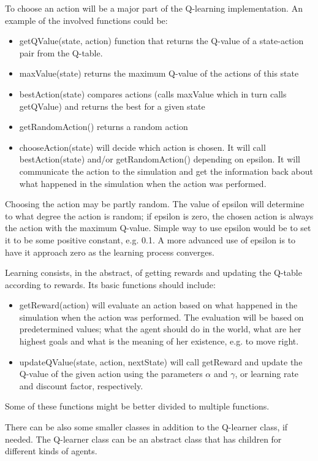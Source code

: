 \documentclass{article}
\begin{document}
To choose an action will be a major part of the Q-learning implementation. An
example of the involved functions could be:
\begin{itemize}
  \item getQValue(state, action) function that returns the Q-value of a
    state-action pair from the Q-table.
  \item maxValue(state) returns the maximum Q-value of the actions of this state
  \item bestAction(state) compares actions (calls maxValue which in turn calls
    getQValue) and returns the best for a given state
  \item getRandomAction() returns a random action
  \item chooseAction(state) will decide which action is chosen. It will call
    bestAction(state) and/or getRandomAction() depending on epsilon. It
    will communicate the action to the simulation
    and get the information back about what happened in the simulation when the
    action was performed.
\end{itemize}
Choosing the action may be partly random. The value of epsilon will determine to
what degree the action is random; if epsilon is zero, the chosen action is
always the action with the maximum Q-value. Simple way to use epsilon would be
to set it to be some positive constant, e.g. 0.1. A more advanced use of
epsilon is to have it approach zero as the learning process converges.

Learning consists, in the abstract, of getting rewards and updating the Q-table
according to rewards. Its basic functions should include:
\begin{itemize}
  \item getReward(action) will evaluate an action based
  on what happened in the simulation when the action was performed.
  The evaluation
  will be based on predetermined values; what the agent should do in the world,
  what are her highest goals and what is the meaning of her existence, e.g. to
  move right.
  \item updateQValue(state, action, nextState) will call getReward and
  update the
  Q-value of the given action using the parameters $\alpha$ and $\gamma$,
  or learning rate and discount factor, respectively.
\end{itemize}

Some of these functions might be better divided to multiple
functions.

There can be also some smaller classes in addition to the Q-learner class,
if needed. The Q-learner class can be an abstract class that has children
for different kinds of agents.
\end{document}
